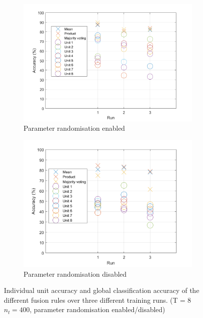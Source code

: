 \documentclass[10pt,technote]{IEEEtran}
\begin{document}
\begin{figure}
    \centering
    \begin{subfigure}[b]{0.5\textwidth}
        \includegraphics[width=\linewidth]{../results/ex2LDAEnsemble/acc_vs_unit.png}
        \caption{Parameter randomisation enabled}
    \end{subfigure}
    \begin{subfigure}[b]{0.5\textwidth}
        \includegraphics[width=\linewidth]{../results/ex2LDAEnsemble/acc_vs_unit_no_rand.png}
        \caption{Parameter randomisation disabled}
    \end{subfigure}
    \caption{Individual unit accuracy and global classification accuracy of the different fusion rules over three different training runs. (T = 8 $n_t = 400$, parameter randomisation enabled/disabled)}
    \label{fig:acc_unit_error}
\end{figure}
\end{document}

